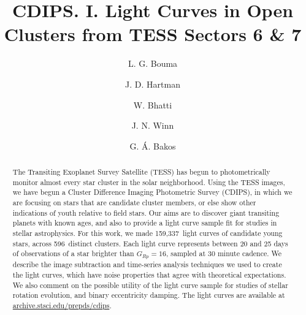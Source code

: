 \documentclass[12pt,twocolumn,tighten]{aastex62}
\newcommand{\numberlcs}{159{,}337\ } %
\newcommand{\numberclusters}{596\ } %
\newcommand{\stscilink}{\url{archive.stsci.edu/prepds/cdips}}
\begin{document}
\title{
  CDIPS. I. Light Curves in Open Clusters from TESS Sectors 6 \& 7
}


\author[0000-0002-0514-5538]{L. G. Bouma}
%
\author[0000-0001-8732-6166]{J. D. Hartman}
%
\author[0000-0002-0628-0088]{W. Bhatti}
%
\author[0000-0002-4265-047X]{J. N. Winn}
%
\author[0000-0001-7204-6727]{G. \'A. Bakos}

\begin{abstract}
  The Transiting Exoplanet Survey Satellite (TESS) has begun to
  photometrically monitor almost every star cluster in the solar
  neighborhood.
  Using the TESS images, we have begun a Cluster Difference Imaging
  Photometric Survey (CDIPS), in which we are focusing on stars that
  are candidate cluster members, or else show other indications of
  youth relative to field stars.
  Our aims are to discover giant transiting planets with known
  ages, and also to provide a light curve sample fit for studies in
  stellar astrophysics.
  For this work, we made \numberlcs light curves of candidate young
  stars, across \numberclusters distinct clusters.  Each light curve
  represents between 20 and 25 days of observations of a star brighter
  than $G_{Rp}=16$, sampled at 30 minute cadence.
  We describe the image subtraction and time-series analysis
  techniques we used to create the light curves, which have noise
  properties that agree with theoretical expectations.
  We also comment on the possible utility of the light curve sample for
  studies of stellar rotation evolution, and binary eccentricity
  damping.
  The light curves are available at \stscilink.
\end{abstract}

\end{document}
